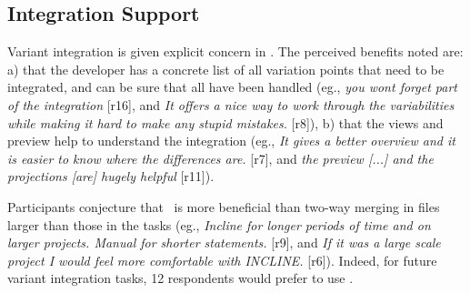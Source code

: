 \subsection{Integration Support}
Variant integration is given explicit concern in \tooln. The perceived benefits noted are: a) that the developer has a concrete list of all variation points that need to be integrated, and can be sure that all have been handled (eg., \textit{\bc you wont forget part of the integration\ec} [r16], and \textit{\bc It offers a nice way to work through the variabilities while making it hard to make any stupid mistakes.\ec} [r8]), b) that the views and preview help to understand the integration (eg., \textit{\bc It gives a better overview and it is easier to know where the differences are.\ec} [r7], and \textit{\bc the preview [...] and the projections [are] hugely helpful\ec} [r11]).

Participants conjecture that \tooln~is more beneficial than two-way merging in files larger than those in the tasks (eg., \textit{\bc Incline for longer periods of time and on larger projects. Manual for shorter statements.\ec} [r9], and \textit{\bc If it was a large scale project I would feel more comfortable with INCLINE.\ec} [r6]). Indeed, for future variant integration tasks, 12 respondents would prefer to use \tooln.



